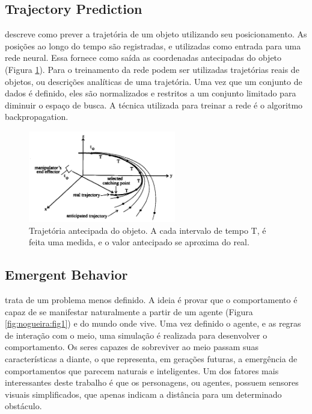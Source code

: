 \documentclass{article}
\begin{document}
\subsection{Trajectory Prediction}
 descreve como prever a trajetória de um objeto utilizando seu posicionamento. As posições ao longo do tempo são registradas, e utilizadas como entrada para uma rede neural. Essa fornece como saída as coordenadas antecipadas do objeto (Figura \ref{fig:payeur:fig1}). Para o treinamento da rede podem ser utilizadas trajetórias reais de objetos, ou descrições analíticas de uma trajetória. Uma vez que um conjunto de dados é definido, eles são normalizados e restritos a um conjunto limitado para diminuir o espaço de busca. A técnica utilizada para treinar a rede é o algoritmo backpropagation.

\begin{figure}[ht]
  \centering
  \includegraphics[height=150px]{images/payeur_trajectory.png}
  \caption{Trajetória antecipada do objeto. A cada intervalo de tempo T, é feita uma medida, e o valor antecipado se aproxima do real.}
  \label{fig:payeur:fig1}
\end{figure}

\subsection{Emergent Behavior}
 trata de um problema menos definido. A ideia é provar que o comportamento é capaz de se manifestar naturalmente a partir de um agente (Figura \ref{fig:nogueira:fig1}) e do mundo onde vive. Uma vez definido o agente, e as regras de interação com o meio, uma simulação é realizada para desenvolver o comportamento. Os seres capazes de sobreviver ao meio passam suas características a diante, o que representa, em gerações futuras, a emergência de comportamentos que parecem naturais e inteligentes. Um dos fatores mais interessantes deste trabalho é que os personagens, ou agentes, possuem sensores visuais simplificados, que apenas indicam a distância para um determinado obstáculo.
\end{document}
